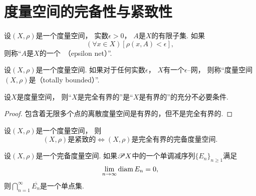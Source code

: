\section{度量空间的完备性与紧致性}
\begin{definition}
设\((X,\rho)\)是一个度量空间，
实数\(\epsilon>0\)，
\(A\)是\(X\)的有限子集.
如果\[
	(\forall x \in X)
	[\rho(x,A) < \epsilon],
\]
则称“\(A\)是\(X\)的一个~（epsilon net）”.
\end{definition}

\begin{definition}
设\((X,\rho)\)是一个度量空间.
如果对于任何实数\(\epsilon\)，
\(X\)有一个\(\epsilon\)--网，
则称“度量空间\((X,\rho)\)是（totally bounded）”.
\end{definition}

\begin{proposition}
设\(X\)是度量空间，
则“\(X\)是完全有界的”是“\(X\)是有界的”的充分不必要条件.
\begin{proof}
包含着无限多个点的离散度量空间是有界的，但不是完全有界的.
\end{proof}
\end{proposition}

\begin{theorem}
设\((X,\rho)\)是一个度量空间，
则\[
	\text{$(X,\rho)$是紧致的}
	\iff
	\text{$(X,\rho)$是完全有界的完备度量空间}.
\]
\end{theorem}

\begin{theorem}
设\((X,\rho)\)是一个完备度量空间.
如果\(\mathscr{P} X\)中的一个单调减序列\(\{E_n\}_{n\geq1}\)满足\[
	\lim_{n\to\infty} \operatorname{diam} E_n = 0,
\]
则\(\bigcap_{n=1}^\infty \overline{E_n}\)是一个单点集.
\end{theorem}
